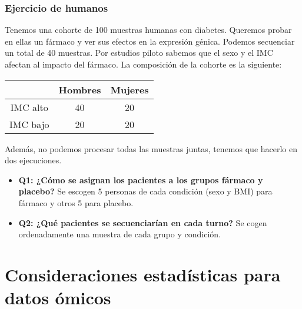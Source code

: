 \subsubsection{Ejercicio de humanos}
Tenemos una cohorte de 100 muestras humanas con diabetes. Queremos probar en ellas un fármaco y ver sus efectos en la expresión génica. Podemos secuenciar un total de 40 muestras. Por estudios piloto sabemos que el sexo y el IMC afectan al impacto del fármaco. La composición de la cohorte es la siguiente:
\begin{table}[h]
\centering
\begin{tabular}{c | c c}
 & Hombres & Mujeres \\ \hline
IMC alto & 40 & 20 \\
IMC bajo & 20 & 20
\end{tabular}
\end{table}
Además, no podemos procesar todas las muestras juntas, tenemos que hacerlo en dos ejecuciones.
\begin{itemize}
\item \textbf{Q1: ¿Cómo se asignan los pacientes a los grupos fármaco y placebo?} Se escogen 5 personas de cada condición (sexo y BMI) para fármaco y otros 5 para placebo. 
\item \textbf{Q2: ¿Qué pacientes se secuenciarían en cada turno?} Se cogen ordenadamente una muestra de cada grupo y condición.
\end{itemize}

\section{Consideraciones estadísticas para datos ómicos}
